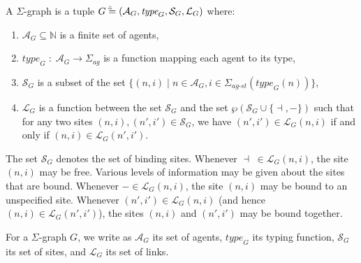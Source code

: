\documentclass{entcs}
\newcommand{\freesymbol}{\dashv}
\newcommand{\boundsymbol}{-}
\renewcommand{\bound}[1]{\boundsymbol}
\newcommand{\graphsymb}{G}
\newcommand{\agentname}{\signaturesymb_{\textit{ag}}}
\newcommand{\linksite}{\signaturesymb_{\textit{ag-st}}}
\newcommand{\signaturesymb}{\Sigma}
\newcommand{\bydef}{\stackrel{\scalebox{0.8}{\!\!$\scriptscriptstyle{\triangle}$}}{=}}
\newcommand{\agents}[1][\graphsymb]{\mathcal{A}_{#1}}
\newcommand{\type}[1][\graphsymb]{\textit{type}_{#1}}
\newcommand{\sites}[1][\graphsymb]{\mathcal{S}_{#1}}
\newcommand{\links}[1][\graphsymb]{\mathcal{L}_{#1}}
\newcommand{\ext}{\{\freesymbol{},\bound{}\}}
\newcommand{\graphtuple}[1][]{(\agents[#1],\type[#1],\sites[#1],\links[#1])}
\begin{document}
\begin{defn}\label{def:summary}
A $\Sigma$-graph is a tuple $\graphsymb\bydef\graphtuple[G]$ where:
\begin{enumerate}
\item $\agents[G]\subseteq \mathbb{N}$ is a finite set of agents,
\item $\type[G]\;:\;\agents\rightarrow \agentname$ is a function mapping each agent to its type,
\item $\sites[G]$ is a subset of the set $\{(n,i)\;|\; n\in \agents, i\in\linksite(\type[G](n))\}$,
\item $\links[G]$ is a function between the set $\sites$ and the set
 $\wp(\sites\cup\ext)$  such that for any two sites $(n,i),(n',i')\in\sites$, we have $(n',i')\in\links[G](n,i)$ if and only if $(n,i)\in\links[G](n',i')$.
\end{enumerate}
\end{defn}

The set $\sites$ denotes the set of binding sites.
Whenever $\freesymbol\;\in\links(n,i)$, the site $(n,i)$ may be free.
Various levels of information may be given about the sites that are bound.
Whenever $\bound{}\in\links(n,i)$, the site $(n,i)$ may be bound to an unspecified site.
Whenever $(n',i')\in\links(n,i)$ (and hence $(n,i)\in\links(n',i')$), the sites $(n,i)$ and $(n',i')$ may be bound together.

For a $\Sigma$-graph $\graphsymb$, we write as $\agents[\graphsymb]$ its set of agents, $\type[\graphsymb]$ its typing function, $\sites[\graphsymb]$ its set of sites, and $\links[\graphsymb]$ its set of links.
\end{document}
